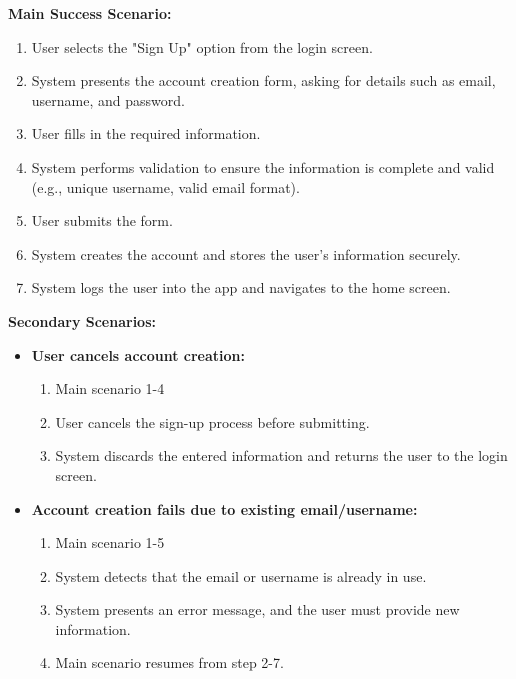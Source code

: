 \documentclass{article}
\begin{document}
\begin{enumerate}[label=\textbf{UC\arabic*}]
          \textbf{Main Success Scenario:}
          \begin{enumerate}[label=\textbf{\arabic*.}]
              \item User selects the "Sign Up" option from the login screen.
              \item System presents the account creation form, asking for details such as email, username, and password.
              \item User fills in the required information.
              \item System performs validation to ensure the information is complete and valid (e.g., unique username, valid email format).
              \item User submits the form.
              \item System creates the account and stores the user’s information securely.
              \item System logs the user into the app and navigates to the home screen.
          \end{enumerate}

          \textbf{Secondary Scenarios:}
          \begin{itemize}
              \item[{}] \textbf{User cancels account creation:}
                    \begin{enumerate}[label=\textbf{\arabic*.}]
                        \item Main scenario 1-4
                        \item User cancels the sign-up process before submitting.
                        \item System discards the entered information and returns the user to the login screen.
                    \end{enumerate}

              \item[{}] \textbf{Account creation fails due to existing email/username:}
                    \begin{enumerate}[label=\textbf{\arabic*.}]
                        \item Main scenario 1-5
                        \item System detects that the email or username is already in use.
                        \item System presents an error message, and the user must provide new information.
                        \item Main scenario resumes from step 2-7.
                    \end{enumerate}
          \end{itemize}


\end{enumerate}
\end{document}
